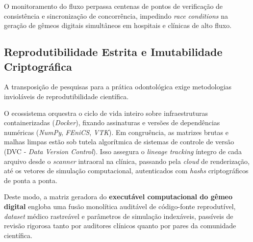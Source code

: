 O monitoramento do fluxo perpassa centenas de pontos de verificação de consistência e sincronização de concorrência, impedindo \textit{race conditions} na geração de gêmeos digitais simultâneos em hospitais e clínicas de alto fluxo.

\subsection{Reprodutibilidade Estrita e Imutabilidade Criptográfica}
\label{subsec:reprodutibilidade}

A transposição de pesquisas para a prática odontológica exige metodologias invioláveis de reprodutibilidade científica.

O ecossistema orquestra o ciclo de vida inteiro sobre infraestruturas containerizadas (\textit{Docker}), fixando assinaturas e versões de dependências numéricas (\textit{NumPy}, \textit{FEniCS}, \textit{VTK}). Em congruência, as matrizes brutas e malhas limpas estão sob tutela algorítmica de sistemas de controle de versão (DVC - \textit{Data Version Control}). Isso assegura o \textit{lineage tracking} íntegro de cada arquivo desde o \textit{scanner} intraoral na clínica, passando pela \textit{cloud} de renderização, até os vetores de simulação computacional, autenticados com \textit{hashs} criptográficos de ponta a ponta.

Deste modo, a matriz geradora do \textbf{executável computacional do gêmeo digital} engloba uma fusão monolítica auditável de código-fonte reprodutível, \textit{dataset} médico rastreável e parâmetros de simulação indexáveis, passíveis de revisão rigorosa tanto por auditores clínicos quanto por pares da comunidade científica.
